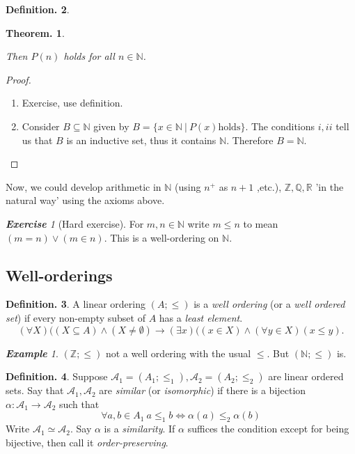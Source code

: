 \documentclass[a4paper,oneside,11pt,DIV=12,parskip=half]{scrartcl}
\newcommand{\R}{\mathbb R}
\newcommand{\N}{\mathbb N}
\newcommand{\A}{\mathcal A}
\theoremstyle{plain}
\newtheorem{theorem}{Theorem.}[section]
\theoremstyle{definition}
\newtheorem{definition}[theorem]{Definition.}
\newtheorem{remark, definition}[theorem]{Remark and Definition.}
\newtheorem{lemma, definition}[theorem]{Lemma and Definition.}
\newtheorem{theorem, definition}[theorem]{Theorem and Definition.}
\theoremstyle{remark}
\newtheorem*{exercise}{\textbf{Exercise}}
\newtheorem*{example}{\textbf{Example}}
\newtheorem*{remark, example}{\textbf{Remark and Exercise}}
\begin{document}
\begin{definition}
\begin{enumerate}
\begin{theorem}
\begin{enumerate}
\begin{enumerate}
            \end{enumerate}
            Then $P(n)$ holds for all $n \in \N$.
    \end{enumerate}
    \end{theorem}
    \begin{proof}
    \begin{enumerate}
        \item  Exercise, use definition.
        \item Consider $B \subseteq \N$ given by $B = \{ x \in \N ~|~ P(x) \text{holds} \}$. The conditions $i,ii$ tell us that $B$ is an inductive set, thus it contains $\N$. Therefore $B = \N$.
    \end{enumerate}
    \end{proof}
    Now, we could develop arithmetic in $\N$ (using $n^+$ as $ n+1$ ,etc.), $\mathbb{Z},\mathbb{Q},\R$ 'in the natural way' using the axioms above.
    \begin{exercise}[Hard exercise]
        For $m,n \in \N$ write $m \leq n$ to mean $(m = n) \lor (m \in n)$. This is a well-ordering on $\N$.
    \end{exercise}
\end{enumerate}
\end{definition}

\subsection{Well-orderings}

\begin{definition}
A linear ordering $(A;\leq)$ is a \emph{well ordering} (or a \emph{well ordered set}) if every non-empty subset of $A$ has a \emph{least element}.
    \[ (\forall X)((X\subseteq A) \land (X \neq \emptyset) \rightarrow (\exists x)((x \in X) \land (\forall y \in X) (x \leq y). \]
\end{definition}

\begin{example}
$(\mathbb{Z};\leq)$ not a well ordering with the usual $\leq$. But $(\N;\leq)$ is.
\end{example}

\begin{definition}
Suppose $\A_1 = (A_1; \leq_1), \A_2 = (A_2; \leq_2)$ are linear ordered sets. Say that $\A_1,\A_2$ are \emph{similar} (or \emph{isomorphic}) if there is a bijection $\alpha: \A_1 \rightarrow \A_2$ such that
    \[ \forall a,b \in A_1 ~ a \leq_1 b \Leftrightarrow \alpha(a) \leq_2 \alpha(b) \]
Write $\A_1 \simeq \A_2$. Say $\alpha$ is a \emph{similarity}. If $\alpha$ suffices the condition except for being bijective, then call it \emph{order-preserving}.
\end{definition}
\end{document}
